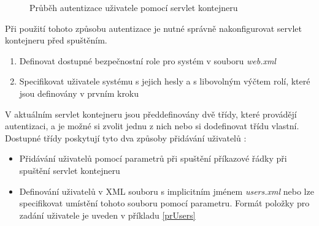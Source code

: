                 \begin{figure}[h!t]
                    \begin{center}
                        \caption{Průběh autentizace uživatele pomocí servlet kontejneru}
                        \label{imgSecurity}
                    \end{center}
                \end{figure}

                Při použití tohoto způsobu autentizace je nutné správně nakonfigurovat servlet kontejneru před spuštěním.
                
                \begin{enumerate}
                    \item Definovat dostupné bezpečnostní role pro systém v souboru \emph{web.xml}
                    \item Specifikovat uživatele systému s jejich hesly a s libovolným výčtem rolí, které
                        jsou definovány v prvním kroku
                \end{enumerate}

                V aktuálním servlet kontejneru jsou předdefinovány dvě třídy, které provádějí autentizaci,
                a je možné si zvolit jednu z nich nebo si dodefinovat třídu vlastní.
                Dostupné třídy poskytují tyto dva způsoby přidávání uživatelů \cite{securityArchitectureWinstone}:

                \begin{itemize}
                    \item Přidávání uživatelů pomocí parametrů při spuštění příkazové řádky při spuštění servlet kontejneru 
                    \item Definování uživatelů v XML souboru s implicitním jménem \emph{users.xml} nebo 
                        lze specifikovat umístění tohoto souboru pomocí parametru. Formát položky
                        pro zadání uživatele je uveden v příkladu \ref{prUsers}
                \end{itemize}


